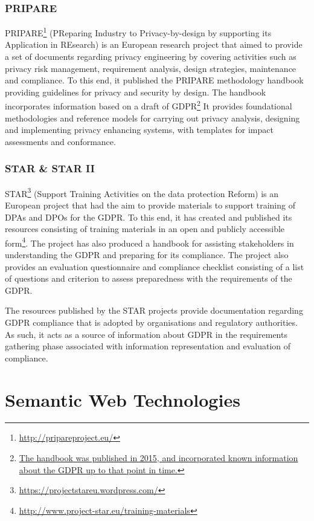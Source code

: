 \subsubsection{PRIPARE}
PRIPARE\footnote{\url{http://pripareproject.eu/}} (PReparing Industry to Privacy-by-design by supporting its Application in REsearch) is an European research project that aimed to provide a set of documents regarding privacy engineering by covering activities such as privacy risk management, requirement analysis, design strategies, maintenance and compliance. To this end, it published the PRIPARE methodology handbook \cite{noauthor_pripare-methodology-handbook-final-feb-24-2016.pdf_nodate} providing guidelines for privacy and security by design. The handbook incorporates information based on a draft of GDPR\footnote{\url{The handbook was published in 2015, and incorporated known information about the GDPR up to that point in time.}} It provides foundational methodologies and reference models for carrying out privacy analysis, designing and implementing privacy enhancing systems, with templates for impact assessments and conformance. 

\subsubsection{STAR \& STAR II}
STAR\footnote{\url{https://projectstareu.wordpress.com/}} (Support Training Activities on the data protection Reform) is an European project that had the aim to provide materials to support training of DPAs and DPOs for the GDPR. To this end, it has created and published its resources consisting of training materials in an open and publicly accessible form\footnote{\url{http://www.project-star.eu/training-materials}}. The project has also produced a handbook for assisting stakeholders in understanding the GDPR and preparing for its compliance. The project also provides an evaluation questionnaire and compliance checklist \cite{noauthor_gdpr_2019-1}consisting of a list of questions and criterion to assess preparedness with the requirements of the GDPR. 

The resources published by the STAR projects provide documentation regarding GDPR compliance that is adopted by organisations and regulatory authorities. As such, it acts as a source of information about GDPR in the requirements gathering phase associated with information representation and evaluation of compliance.

\section{Semantic Web Technologies}\label{sec:background:semweb}

